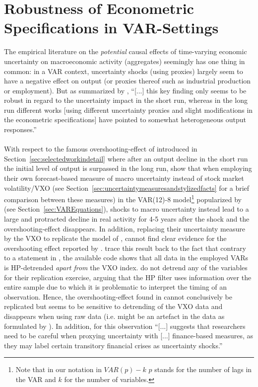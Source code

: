 \documentclass[a4paper,11pt,listof=nochaptergap,oneside,pointednumbers,bibtotoc,bigheadings,liststotoc,hidelinks]{scrbook}
\theoremstyle{mysatz}
\theoremstyle{mydefinition}
\theoremstyle{mytheorem}
\theoremstyle{mybemerkung}
\begin{document}
\section[Robustness of Econometric Specifications in VAR-Settings]{Robustness of Econometric Specifications in VAR-Settings}
\label{sec:robustnessofeconspecs}
The empirical literature on the \textit{potential} causal effects of time-varying economic uncertainty on macroeconomic activity (aggregates) seemingly has one thing in common: in a VAR context, uncertainty shocks (using proxies) largely seem to have a negative effect on output (or proxies thereof such as industrial production or employment). But as summarized by \citet[p. 23]{bontempietal:16}, ``[...] this key finding only seems to be robust in regard to the uncertainty impact in the short run, whereas in the long run different works [using different uncertainty proxies and slight modifications in the econometric specifications] have pointed to somewhat heterogeneous output responses.''\\
\\
With respect to the famous overshooting-effect of \citet{bloom:09} introduced in Section~\ref{sec:selectedworkindetail} where after an output decline in the short run the initial level of output is surpassed in the long run, \citet{juradoetal:15} show that when employing their own forecast-based measure of macro uncertainty instead of stock market volatility/VXO (see Section~\ref{sec:uncertaintymeasuresandstylizedfacts} for a brief comparison between these measures) in the VAR(12)-8 model\footnote{Note that in our notation in $VAR(p)-k$ $p$ stands for the number of lags in the VAR and $k$ for the number of variables.} popularized by \citet{bloom:09} (see Section~\ref{sec:VAREquations}), shocks to macro uncertainty instead lead to a large and protracted decline in real activity for 4-5 years after the shock and the overshooting-effect disappears. In addition, replacing their uncertainty measure by the VXO to replicate the model of \citet{bloom:09}, \citet{juradoetal:15} cannot find clear evidence for the overshooting effect reported by \citet{bloom:09}. \citet{juradoetal:15} trace this result back to the fact that contrary to a statement in \citet{bloom:09}, the available code shows that all data in the employed VARs is HP-detrended \textit{apart from} the VXO index. \citet{juradoetal:15} do not detrend any of the variables for their replication exercise, arguing that the HP filter uses information over the entire sample due to which it is problematic to interpret the timing of an observation. Hence, the overshooting-effect found in \citet{bloom:09} cannot conclusively be replicated but seems to be sensitive to detrending of the VXO data and disappears when using raw data (i.e. might be an artefact in the data as formulated by \citealp{bontempietal:16}). In addition, for \citet[p. 24]{bontempietal:16} this observation ``[...] suggests that researchers need to be careful when proxying uncertainty with [...] finance-based measures, as they may label certain transitory financial crises as uncertainty shocks.''
\end{document}
